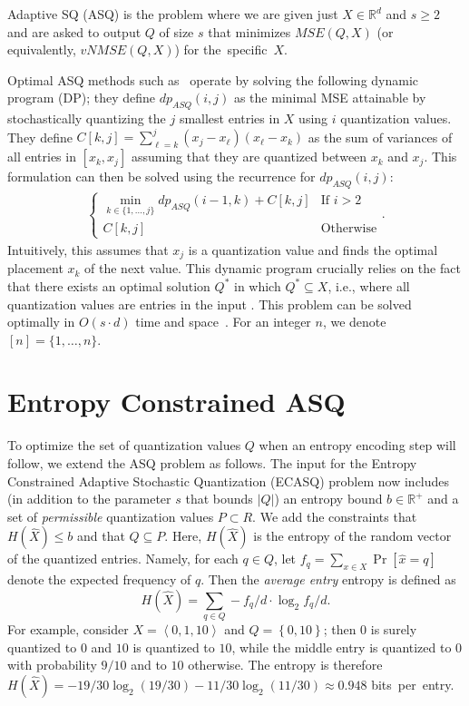 \documentclass[11pt,letterpaper]{article}
\newcommand{\angles}[1]{\left\langle#1\right\rangle}
\newcommand{\set}[1]{\left\{#1\right\}}
\newcommand{\MM}[1]{\textcolor{purple}{MM:~#1}}
\newcommand{\MM}[1]{}
\begin{document}
Adaptive SQ (ASQ) is the problem where we are given just $X\in\mathbb R^d$ and $s\ge 2$ and are asked to output $Q$ of size $s$ that minimizes $MSE(Q,X)$ (or equivalently, $vNMSE(Q,X)$) for \mbox{the specific $X$.}

Optimal ASQ methods such as~\cite{zhang2017zipml,ben2024optimal} operate by solving the following dynamic program (DP); they define $dp_{ASQ}(i,j)$ as the minimal MSE attainable by stochastically quantizing the $j$ smallest entries in $X$ using $i$ quantization values.
They define $C[k,j]=\sum_{\ell= k}^j(x_j-x_\ell)(x_\ell-x_k)$ as the sum of variances of all entries in $[x_k,x_j]$ assuming that they are quantized between $x_k$ and $x_j$.
This formulation can then be solved using the recurrence for $dp_{ASQ}(i,j):$
{
\begin{align}
     \begin{cases}
        \min\limits_{k\in\{1,\ldots,j\}} dp_{ASQ}(i-1,k) + C[k,j] & \mbox{If $i > 2$}\\
        C[k,j]        & \mbox{Otherwise}
    \end{cases}.\label{eq:asqdp}
\end{align}
}
\!Intuitively, this assumes that $x_j$ is a quantization value and finds the optimal placement $x_k$ of the next value.
This dynamic program crucially relies on the fact that there exists an optimal solution $Q^*$ in which $Q^*\subseteq X$, i.e., where all quantization values are entries {in the input} \cite{zhang2017zipml,ben2024optimal}. This problem can be solved optimally in $O(s\cdot d)$ time and space~\cite{ben2024optimal}.
For an integer $n$, we denote $[n]=\{1,\ldots,n\}$.

\section{Entropy Constrained ASQ}
To optimize the set of quantization values $Q$ when an entropy encoding step will follow, we extend the ASQ problem as follows.
The input for the Entropy Constrained Adaptive Stochastic Quantization (ECASQ) problem now includes (in addition to the parameter $s$ that bounds $|Q|$) an entropy bound $b\in\mathbb R^+$ and a set of \textit{permissible} quantization values $P\subset R$. We add the constraints that $H(\widehat X)\le b$ and that $Q\subseteq P$. Here, $H(\widehat X)$ is the entropy of the random vector of the quantized entries. Namely, for each $q\in Q$, let $f_q=\sum_{x\in X}\Pr[\widehat x = q]$ denote the expected frequency of $q$. Then the \textit{average entry} entropy is defined as 
$$
H(\widehat X) = \sum_{q\in Q} -f_q/d \cdot \log_2 f_q/d.
$$
For example, consider $X=\angles{0,1,10}$ and $Q=\set{0,10}$; then $0$ is surely quantized to $0$ and $10$ is quantized to $10$, while the middle entry is quantized to $0$ with probability $9/10$ and to $10$ otherwise. The entropy is therefore $H(\widehat X)=-19/30\log_2(19/30)-11/30\log_2(11/30)\approx 0.948$ \mbox{bits per entry.}
\end{document}
